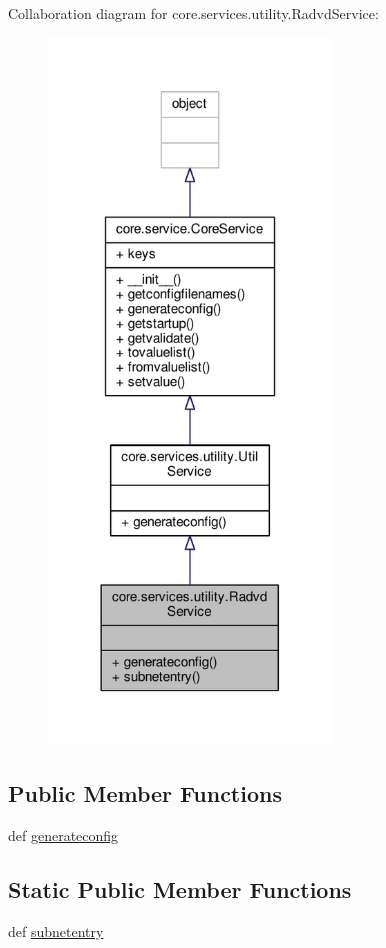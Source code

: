 Collaboration diagram for core.\+services.\+utility.\+Radvd\+Service\+:
\nopagebreak
\begin{figure}[H]
\begin{center}
\leavevmode
\includegraphics[width=213pt]{classcore_1_1services_1_1utility_1_1_radvd_service__coll__graph}
\end{center}
\end{figure}
\subsection*{Public Member Functions}
\begin{DoxyCompactItemize}
\item 
def \hyperlink{classcore_1_1services_1_1utility_1_1_radvd_service_a44e7bf226dd41c067ab43d95bd6469fd}{generateconfig}
\end{DoxyCompactItemize}
\subsection*{Static Public Member Functions}
\begin{DoxyCompactItemize}
\item 
def \hyperlink{classcore_1_1services_1_1utility_1_1_radvd_service_aadb6a9905570bfc11dc90ca7d54da64b}{subnetentry}
\end{DoxyCompactItemize}
